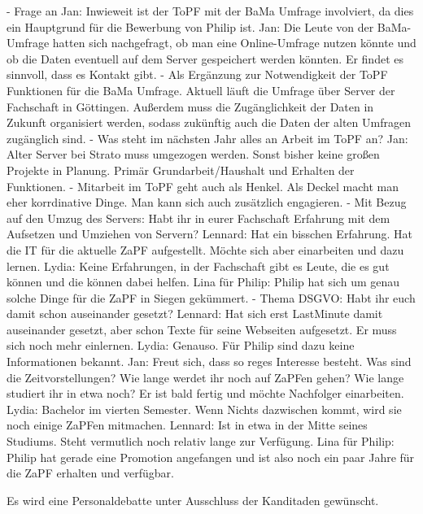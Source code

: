     \begin{outline}
      - Frage an Jan: Inwieweit ist der ToPF mit der BaMa Umfrage involviert, da dies ein Hauptgrund für die Bewerbung von Philip ist.
        \2 Jan: Die Leute von der BaMa-Umfrage hatten sich nachgefragt, ob man eine Online-Umfrage nutzen könnte und ob die Daten eventuell auf dem Server gespeichert werden könnten. Er findet es sinnvoll, dass es Kontakt gibt.
        - Als Ergänzung zur Notwendigkeit der ToPF Funktionen für die BaMa Umfrage. Aktuell läuft die Umfrage über Server der Fachschaft in Göttingen. Außerdem muss die Zugänglichkeit der Daten in Zukunft organisiert werden, sodass zukünftig auch die Daten der alten Umfragen zugänglich sind.
      - Was steht im nächsten Jahr alles an Arbeit im ToPF an?
        \2 Jan: Alter Server bei Strato muss umgezogen werden. Sonst bisher keine großen Projekte in Planung. Primär Grundarbeit/Haushalt und Erhalten der Funktionen.
        - Mitarbeit im ToPF geht auch als Henkel. Als Deckel macht man eher korrdinative Dinge. Man kann sich auch zusätzlich engagieren.
      - Mit Bezug auf den Umzug des Servers: Habt ihr in eurer Fachschaft Erfahrung mit dem Aufsetzen und Umziehen von Servern?
        \2 Lennard: Hat ein bisschen Erfahrung. Hat die IT für die aktuelle ZaPF aufgestellt. Möchte sich aber einarbeiten und dazu lernen.
        \2 Lydia: Keine Erfahrungen, in der Fachschaft gibt es Leute, die es gut können und die können dabei helfen.
        \2 Lina für Philip: Philip hat sich um genau solche Dinge für die ZaPF in Siegen gekümmert.
      - Thema DSGVO: Habt ihr euch damit schon auseinander gesetzt?
        \2 Lennard: Hat sich erst LastMinute damit auseinander gesetzt, aber schon Texte für seine Webseiten aufgesetzt. Er muss sich noch mehr einlernen.
        \2 Lydia: Genauso.
        \2 Für Philip sind dazu keine Informationen bekannt.
      \1 Jan: Freut sich, dass so reges Interesse besteht. Was sind die Zeitvorstellungen? Wie lange werdet ihr noch auf ZaPFen gehen? Wie lange studiert ihr in etwa noch? Er ist bald fertig und möchte Nachfolger einarbeiten.
        \2 Lydia: Bachelor im vierten Semester. Wenn Nichts dazwischen kommt, wird sie noch einige ZaPFen mitmachen.
        \2 Lennard: Ist in etwa in der Mitte seines Studiums. Steht vermutlich noch relativ lange zur Verfügung.
        \2 Lina für Philip: Philip hat gerade eine Promotion angefangen und ist also noch ein paar Jahre für die ZaPF erhalten und verfügbar.
    \end{outline}
    Es wird eine Personaldebatte unter Ausschluss der Kanditaden gewünscht.

